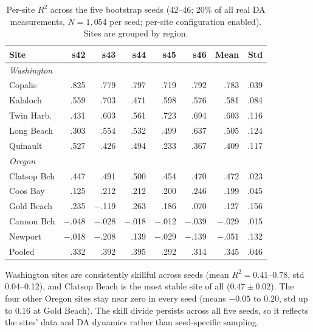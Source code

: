 \documentclass[toxins,article,submit,moreauthors]{Definitions/mdpi}
\begin{document}
\begin{table}[H]
\caption{Per-site $R^2$ across the five bootstrap seeds (42--46; 20\% of all real DA measurements, $N = 1{,}054$ per seed; per-site configuration enabled). Sites are grouped by region.}
\label{tab:seed-stability}
\centering\scriptsize
\begin{tabular*}{\linewidth}{@{\extracolsep{\fill}}lrrrrrrr}
\toprule
\textbf{Site} & \textbf{s42} & \textbf{s43} & \textbf{s44} & \textbf{s45} & \textbf{s46} & \textbf{Mean} & \textbf{Std} \\
\midrule
\multicolumn{8}{l}{\textit{Washington}} \\
Copalis      & .825 & .779 & .797 & .719 & .792 & .783 & .039 \\
Kalaloch     & .559 & .703 & .471 & .598 & .576 & .581 & .084 \\
Twin Harb.   & .431 & .603 & .561 & .723 & .694 & .603 & .116 \\
Long Beach   & .303 & .554 & .532 & .499 & .637 & .505 & .124 \\
Quinault     & .527 & .426 & .494 & .233 & .367 & .409 & .117 \\
\midrule
\multicolumn{8}{l}{\textit{Oregon}} \\
Clatsop Bch  & .447 & .491 & .500 & .454 & .470 & .472 & .023 \\
Coos Bay     & .125 & .212 & .212 & .200 & .246 & .199 & .045 \\
Gold Beach   & .235 & $-$.119 & .263 & .186 & .070 & .127 & .156 \\
Cannon Bch   & $-$.048 & $-$.028 & $-$.018 & $-$.012 & $-$.039 & $-$.029 & .015 \\
Newport      & $-$.018 & $-$.208 & .139 & $-$.029 & $-$.139 & $-$.051 & .132 \\
\midrule
Pooled       & .332 & .392 & .395 & .292 & .314 & .345 & .046 \\
\bottomrule
\end{tabular*}
\end{table}

Washington sites are consistently skillful across seeds (mean $R^2 = 0.41$--$0.78$, std 0.04--0.12), and Clatsop Beach is the most stable site of all ($0.47 \pm 0.02$). The four other Oregon sites stay near zero in every seed (means $-0.05$ to $0.20$, std up to 0.16 at Gold Beach). The skill divide persists across all five seeds, so it reflects the sites' data and DA dynamics rather than seed-specific sampling.



\end{document}
